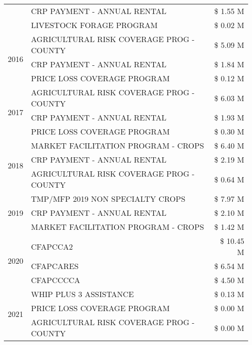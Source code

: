 \begin{tabular}{llr}
 & CRP PAYMENT - ANNUAL RENTAL & \$ 1.55 M \\
 & LIVESTOCK FORAGE PROGRAM & \$ 0.02 M \\
\cline{1-3}
\multirow[t]{3}{*}{2016} & AGRICULTURAL RISK COVERAGE PROG - COUNTY & \$ 5.09 M \\
 & CRP PAYMENT - ANNUAL RENTAL & \$ 1.84 M \\
 & PRICE LOSS COVERAGE PROGRAM & \$ 0.12 M \\
\cline{1-3}
\multirow[t]{3}{*}{2017} & AGRICULTURAL RISK COVERAGE PROG - COUNTY & \$ 6.03 M \\
 & CRP PAYMENT - ANNUAL RENTAL & \$ 1.93 M \\
 & PRICE LOSS COVERAGE PROGRAM & \$ 0.30 M \\
\cline{1-3}
\multirow[t]{3}{*}{2018} & MARKET FACILITATION PROGRAM - CROPS & \$ 6.40 M \\
 & CRP PAYMENT - ANNUAL RENTAL & \$ 2.19 M \\
 & AGRICULTURAL RISK COVERAGE PROG - COUNTY & \$ 0.64 M \\
\cline{1-3}
\multirow[t]{3}{*}{2019} & TMP/MFP 2019 NON SPECIALTY CROPS & \$ 7.97 M \\
 & CRP PAYMENT - ANNUAL RENTAL & \$ 2.10 M \\
 & MARKET FACILITATION PROGRAM - CROPS & \$ 1.42 M \\
\cline{1-3}
\multirow[t]{3}{*}{2020} & CFAPCCA2 & \$ 10.45 M \\
 & CFAPCARES & \$ 6.54 M \\
 & CFAPCCCCA & \$ 4.50 M \\
\cline{1-3}
\multirow[t]{3}{*}{2021} & WHIP PLUS 3 ASSISTANCE & \$ 0.13 M \\
 & PRICE LOSS COVERAGE PROGRAM & \$ 0.00 M \\
 & AGRICULTURAL RISK COVERAGE PROG - COUNTY & \$ 0.00 M \\
\cline{1-3}
\bottomrule
\end{tabular}

